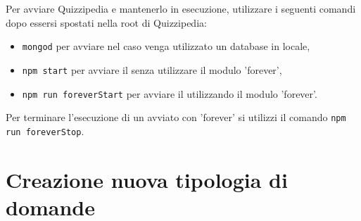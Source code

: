 \documentclass[a4paper, titlepage]{article}
\begin{document}
	Per avviare Quizzipedia e mantenerlo in esecuzione, utilizzare i seguenti comandi dopo essersi spostati nella root di Quizzipedia:
	\begin{itemize}
		\item \texttt{mongod} per avviare  nel caso venga utilizzato un database in locale,
		\item \texttt{npm start} per avviare il  senza utilizzare il modulo 'forever',
		\item \texttt{npm run foreverStart} per avviare il  utilizzando il modulo 'forever'.
	\end{itemize}
	Per terminare l'esecuzione di un  avviato con 'forever' si utilizzi il comando \texttt{npm run foreverStop}.
	
	\newpage
	
	\section{Creazione nuova tipologia di domande}
	
\end{document}
